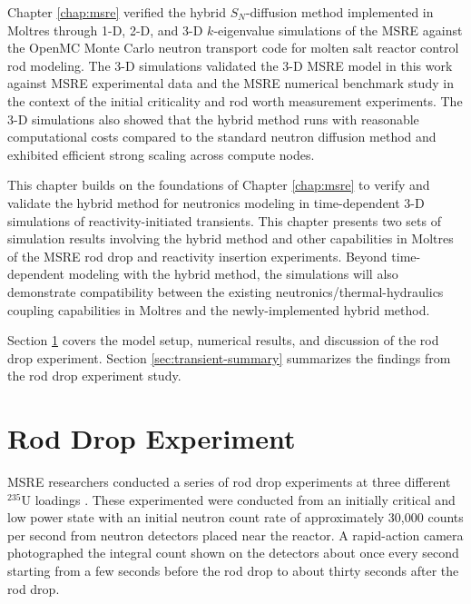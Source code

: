 Chapter \ref{chap:msre} verified the hybrid $S_N$-diffusion method implemented in Moltres through
1-D, 2-D, and 3-D
$k$-eigenvalue simulations of the \gls{MSRE} against the OpenMC Monte Carlo neutron transport code
for molten salt reactor control rod modeling. The 3-D simulations validated the 3-D \gls{MSRE}
model in this work against \gls{MSRE} experimental data and the \gls{MSRE} numerical benchmark
study \cite{fratoni_molten_2020} in the context of the initial criticality and rod worth
measurement experiments. The 3-D simulations also showed that the hybrid method runs with
reasonable computational costs compared to the standard neutron diffusion method and exhibited
efficient strong scaling across compute nodes.

This chapter builds on the foundations of Chapter \ref{chap:msre} to verify and validate the hybrid
method for neutronics modeling in time-dependent 3-D simulations of reactivity-initiated
transients. This chapter presents two sets of simulation results involving the hybrid method and
other capabilities in Moltres of the \gls{MSRE} rod drop and reactivity insertion
experiments. Beyond time-dependent modeling with the hybrid method, the simulations will also
demonstrate compatibility between the existing neutronics/thermal-hydraulics coupling
capabilities in Moltres and the newly-implemented hybrid method.

Section \ref{sec:rod-drop} covers the model setup, numerical results, and discussion of the rod
drop experiment.
Section \ref{sec:transient-summary}
summarizes the findings from the rod drop experiment study.

\section{Rod Drop Experiment} \label{sec:rod-drop}

\gls{MSRE} researchers conducted a series of rod drop experiments at three different $^{235}$U
loadings \cite{prince_zero-power_1968}. These experimented were conducted from an initially critical
and low power state with an initial neutron count rate of approximately 30,000 counts per second
from neutron detectors placed near the reactor. A rapid-action camera photographed the integral
count shown on the detectors about once every second starting from a few seconds before the rod
drop to about thirty seconds after the rod drop.

